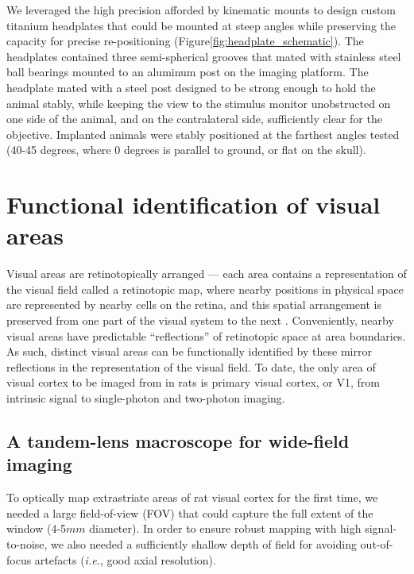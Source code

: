 We leveraged the high precision afforded by kinematic mounts to design custom titanium headplates that could be mounted at steep angles while preserving the capacity for precise re-positioning (Figure\ref{fig:headplate_schematic}). The headplates contained three semi-spherical grooves that mated with stainless steel ball bearings mounted to an aluminum post on the imaging platform. The headplate mated with a steel post designed to be strong enough to hold the animal stably, while keeping the view to the stimulus monitor unobstructed on one side of the animal, and on the contralateral side, sufficiently clear for the objective. Implanted animals were stably positioned at the farthest angles tested (40-45 degrees, where 0 degrees is parallel to ground, or flat on the skull).  

\section{Functional identification of visual areas}
Visual areas are retinotopically arranged --- each area contains a representation of the visual field called a retinotopic map, where nearby positions in physical space are represented by nearby cells on the retina, and this spatial arrangement is preserved from one part of the visual system to the next \cite{REFREF}. Conveniently, nearby visual areas have predictable ``reflections'' of retinotopic space at area boundaries. As such, distinct visual areas can be functionally identified by these mirror reflections in the representation of the visual field. To date, the only area of visual cortex to be imaged from in rats is primary visual cortex, or V1, from intrinsic signal \cite{Gias2004} to single-photon \cite{Scott2018ImagingMacroscope} and two-photon \cite{Ohki2005, Greenberg2008} imaging.

\subsection{A tandem-lens macroscope for wide-field imaging}
To optically map extrastriate areas of rat visual cortex for the first time, we needed a large field-of-view (FOV) that could capture the full extent of the window (4-5$mm$ diameter). In order to ensure robust mapping with high signal-to-noise, we also needed a sufficiently shallow depth of field for avoiding out-of-focus artefacts (\textit{i.e.}, good axial resolution). 

